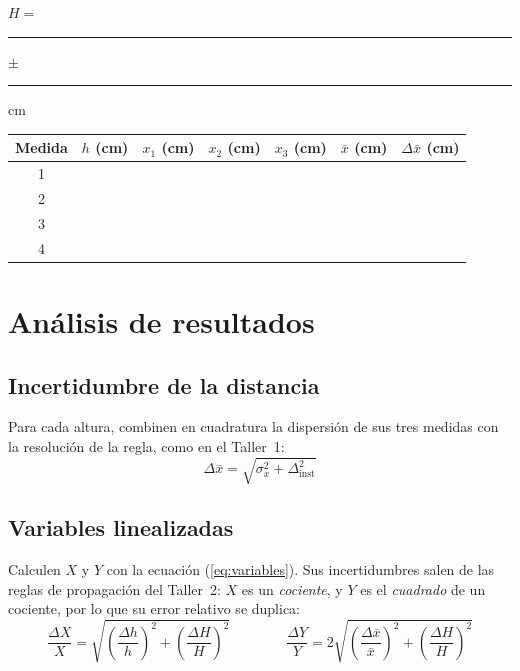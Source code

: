 \documentclass[11pt, letterpaper]{article}
\begin{document}
	\vspace{0.2cm}
	\begin{center}
		\small
		$H = $ \rule{2cm}{0.4pt} $\pm$ \rule{1.2cm}{0.4pt} cm
		
		\vspace{0.3cm}
		\begin{tabular}{|c|c|c|c|c|c|c|}
			\hline
			Medida & $h$ (cm) & $x_1$ (cm) & $x_2$ (cm) & $x_3$ (cm)
			& $\bar{x}$ (cm) & $\Delta\bar{x}$ (cm) \\
			\hline
			\rule{0pt}{3ex} 1 & & & & & & \\ \hline
			\rule{0pt}{3ex} 2 & & & & & & \\ \hline
			\rule{0pt}{3ex} 3 & & & & & & \\ \hline
			\rule{0pt}{3ex} 4 & & & & & & \\ \hline
		\end{tabular}
	\end{center}
	
	\section{Análisis de resultados}
	
	\subsection{Incertidumbre de la distancia}
	
	Para cada altura, combinen en cuadratura la dispersión de sus tres medidas con
	la resolución de la regla, como en el Taller~1:
	\[
	\Delta\bar{x} = \sqrt{\sigma_x^{2} + \Delta_{\text{inst}}^{2}}
	\]
	
	\subsection{Variables linealizadas}
	
	Calculen $X$ y $Y$ con la ecuación (\ref{eq:variables}). Sus incertidumbres
	salen de las reglas de propagación del Taller~2: $X$ es un \emph{cociente}, y
	$Y$ es el \emph{cuadrado} de un cociente, por lo que su error relativo se
	duplica:
	\[
	\frac{\Delta X}{X} = \sqrt{\left(\frac{\Delta h}{h}\right)^{2}
		+ \left(\frac{\Delta H}{H}\right)^{2}}
	\qquad\qquad
	\frac{\Delta Y}{Y} = 2\sqrt{\left(\frac{\Delta\bar{x}}{\bar{x}}\right)^{2}
		+ \left(\frac{\Delta H}{H}\right)^{2}}
	\]
	
\end{document}
